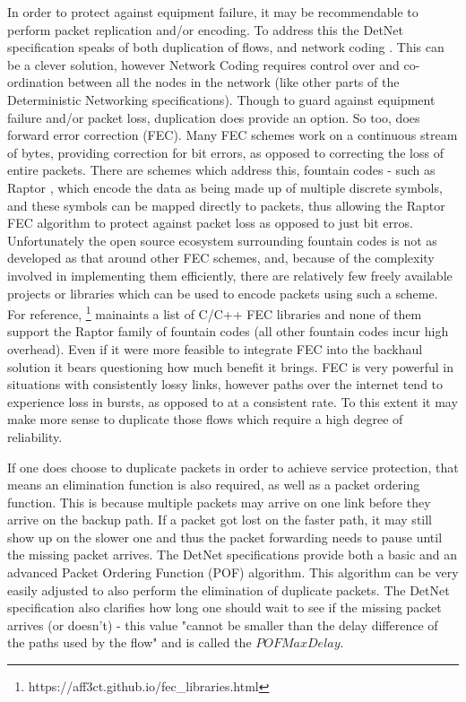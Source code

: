 In order to protect against equipment failure, it may be recommendable to perform packet replication and/or encoding. To address this the DetNet specification speaks of both duplication of flows, and network coding \cite{network-coding}. This can be a clever solution, however Network Coding requires control over and co-ordination between all the nodes in the network (like other parts of the Deterministic Networking specifications). Though to guard against equipment failure and/or packet loss, duplication does provide an option. So too, does forward error correction (FEC). Many FEC schemes work on a continuous stream of bytes, providing correction for bit errors, as opposed to correcting the loss of entire packets. There are schemes which address this, fountain codes - such as Raptor \cite{raptor}, which encode the data as being made up of multiple discrete symbols, and these symbols can be mapped directly to packets, thus allowing the Raptor FEC algorithm to protect against packet loss as opposed to just bit erros. Unfortunately the open source ecosystem surrounding fountain codes is not as developed as that around other FEC schemes, and, because of the complexity involved in implementing them efficiently, there are relatively few freely available projects or libraries which can be used to encode packets using such a scheme. For reference, \footnote{https://aff3ct.github.io/fec\_libraries.html} mainaints a list of C/C++ FEC libraries and none of them support the Raptor family of fountain codes (all other fountain codes incur high overhead). Even if it were more feasible to integrate FEC into the backhaul solution it bears questioning how much benefit it brings. FEC is very powerful in situations with consistently lossy links, however paths over the internet tend to experience loss in bursts, as opposed to at a consistent rate. To this extent it may make more sense to duplicate those flows which require a high degree of reliability. 


If one does choose to duplicate packets in order to achieve service protection, that means an elimination function is also required, as well as a packet ordering function. This is because multiple packets may arrive on one link before they arrive on the backup path. If a packet got lost on the faster path, it may still show up on the slower one and thus the packet forwarding needs to pause until the missing packet arrives. The DetNet specifications provide both a basic and an advanced Packet Ordering Function (POF) algorithm. This algorithm can be very easily adjusted to also perform the elimination of duplicate packets. The DetNet specification also clarifies how long one should wait to see if the missing packet arrives (or doesn't) - this value "cannot be smaller than the delay difference of the paths used by the flow" and is called the $POFMaxDelay$.

